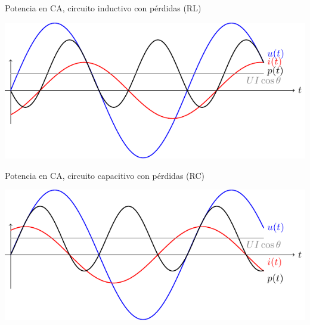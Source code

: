 \documentclass[aspectratio=169, usenames,svgnames,dvipsnames]{beamer}
\begin{document}

\begin{frame}{Potencia en CA, \hspace{3mm}circuito inductivo con pérdidas (RL)}
    \vspace{5mm}
    \begin{center}
        \includegraphics[height=0.7\textheight]{../figs/inductivoPotencia.pdf}
    \end{center}
    
    
\end{frame}


\begin{frame}{Potencia en CA, \hspace{3mm}circuito capacitivo con pérdidas (RC)}
    \vspace{5mm}
    \begin{center}
        \includegraphics[height=0.68\textheight]{../figs/capacitivoPotencia.pdf}
    \end{center}
    
    
\end{frame}
\end{document}
